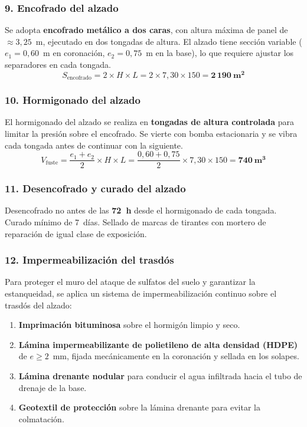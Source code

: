 \subsubsection*{9. Encofrado del alzado}

Se adopta \textbf{encofrado metálico a dos caras}, con altura máxima de panel
de $\approx 3{,}25$~m, ejecutado en dos tongadas de altura. El alzado tiene
sección variable ($e_1 = 0{,}60$~m en coronación, $e_2 = 0{,}75$~m en la
base), lo que requiere ajustar los separadores en cada tongada.
\[
  S_{\mathrm{encofrado}} = 2 \times H \times L
  = 2 \times 7{,}30 \times 150 = \mathbf{2\,190~\text{m}^2}
\]

\subsubsection*{10. Hormigonado del alzado}

El hormigonado del alzado se realiza en \textbf{tongadas de altura controlada}
para limitar la presión sobre el encofrado. Se vierte con bomba estacionaria
y se vibra cada tongada antes de continuar con la siguiente.
\[
  V_{\mathrm{fuste}} = \frac{e_1+e_2}{2} \times H \times L
  = \frac{0{,}60+0{,}75}{2} \times 7{,}30 \times 150
  = \mathbf{740~\text{m}^3}
\]

\subsubsection*{11. Desencofrado y curado del alzado}

Desencofrado no antes de las \textbf{72~h} desde el hormigonado de cada
tongada. Curado mínimo de 7~días. Sellado de marcas de tirantes con mortero
de reparación de igual clase de exposición.

\subsubsection*{12. Impermeabilización del trasdós}

Para proteger el muro del ataque de sulfatos del suelo y garantizar la
estanqueidad, se aplica un sistema de impermeabilización continuo sobre el
trasdós del alzado:
\begin{enumerate}
  \item \textbf{Imprimación bituminosa} sobre el hormigón limpio y seco.
  \item \textbf{Lámina impermeabilizante de polietileno de alta densidad (HDPE)}
        de $e \geq 2$~mm, fijada mecánicamente en la coronación y sellada en
        los solapes.
  \item \textbf{Lámina drenante nodular} para conducir el agua infiltrada
        hacia el tubo de drenaje de la base.
  \item \textbf{Geotextil de protección} sobre la lámina drenante para evitar
        la colmatación.
\end{enumerate}

